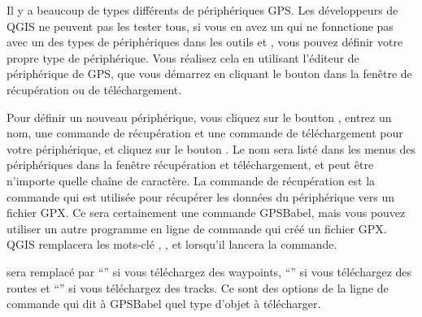 Il y a beaucoup de types diff\'erents de p\'eriph\'eriques GPS.
Les d\'eveloppeurs de QGIS ne peuvent pas les tester tous, si vous en avez un qui
ne fonnctione pas avec un des types de p\'eriph\'eriques dans les outils
 et , vous pouvez d\'efinir votre
propre type de p\'eriph\'erique.
Vous r\'ealisez cela en utilisant l'\'editeur de p\'eriph\'erique de GPS, que vous
d\'emarrez en cliquant le bouton  dans la fen\^etre
de r\'ecup\'eration ou de t\'el\'echargement.

Pour d\'efinir un nouveau p\'eriph\'erique, vous cliquez sur le boutton
, entrez un nom, une commande de r\'ecup\'eration et
une commande de t\'el\'echargement pour votre p\'eriph\'erique, et cliquez sur le
bouton .
Le nom sera list\'e dans les menus des p\'eriph\'eriques dans la fen\^etre r\'ecup\'eration
et t\'el\'echargement, et peut \^etre n'importe quelle cha\^ine de caract\`ere.
La commande de r\'ecup\'eration est la commande qui est utilis\'ee pour r\'ecup\'erer les
donn\'ees du p\'eriph\'erique vers un fichier GPX.
Ce sera certainement une commande GPSBabel, mais vous pouvez utiliser un autre
programme en ligne de commande qui cr\'e\'e un fichier GPX.
QGIS remplacera les mots-cl\'e , , et
 lorsqu'il lancera la commande.

 sera remplac\'e par {}``''  si vous t\'el\'echargez
des waypoints, {}``'' si vous t\'el\'echargez des routes et
{}``'' si vous t\'el\'echargez des tracks.
Ce sont des options de la ligne de commande qui dit \`a GPSBabel quel type
d'objet  \`a t\'el\'echarger.


